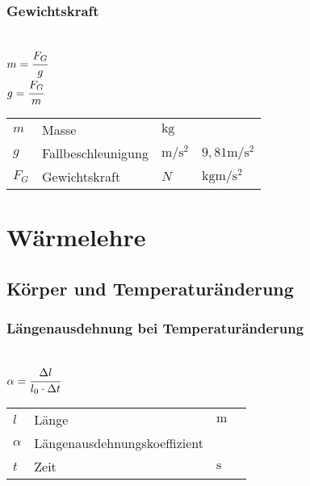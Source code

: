 \documentclass[a4paper, 11pt]{article}
\newcommand\mainformular[1]{\fbox{#1}}      %
\begin{document}
\subsubsection{Gewichtskraft}
\begin{minipage}{0.45\textwidth}

\mainformular{$F_G = m \cdot g$} \\
$m = \cfrac{F_G}{g}$ \\
$g = \cfrac{F_G}{m}$

\end{minipage}
\begin{minipage}{0.45\textwidth}

\begin{tabular}{llll}
$m$ & Masse & $\si{\kilo\gram}$ & \\
$g$ & Fallbeschleunigung & $\si{\metre\per\square\second}$ & $9,81 \si{\metre\per\square\second}$ \\
$F_G$ & Gewichtskraft & $N$ & $\si{\kilogram\metre\per\square\second}$ \\
\end{tabular}

\end{minipage}

\section{Wärmelehre}

\subsection{Körper und Temperaturänderung}
\subsubsection{Längenausdehnung bei Temperaturänderung}
\begin{minipage}{0.45\textwidth}
\mainformular{$\Delta l = \alpha \cdot l_0 \cdot \Delta t$}  \\
$\alpha = \cfrac{\Delta l}{l_0 \cdot \Delta t}$
\end{minipage}
\begin{minipage}{0.45\textwidth}

\begin{tabular}{llll}
$l$ & Länge & $\si{\meter} $ & $ $ \\
$\alpha$ & Längenausdehnungskoeffizient &  & \\
$t$ & Zeit & $\si{\second}$ & \\
\end{tabular}

\end{minipage}
\end{document}
